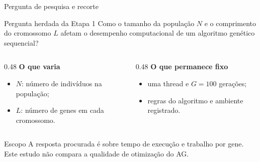 \documentclass[aspectratio=169,11pt]{beamer}
\begin{document}
\begin{frame}{Pergunta de pesquisa e recorte}
    \begin{questionbox}{Pergunta herdada da Etapa 1}
        Como o tamanho da população $N$ e o comprimento do cromossomo $L$
        afetam o desempenho computacional de um algoritmo genético sequencial?
    \end{questionbox}
    \vspace{0.28cm}
    \begin{columns}[T,onlytextwidth]
        \begin{column}{0.48\textwidth}
            \textbf{O que varia}
            \begin{itemize}
                \item $N$: número de indivíduos na população;
                \item $L$: número de genes em cada cromossomo.
            \end{itemize}
        \end{column}
        \begin{column}{0.48\textwidth}
            \textbf{O que permanece fixo}
            \begin{itemize}
                \item uma thread e $G=100$ gerações;
                \item regras do algoritmo e ambiente registrado.
            \end{itemize}
        \end{column}
    \end{columns}
    \vspace{0.25cm}
    \begin{impactbox}{Escopo}
        A resposta procurada é sobre tempo de execução e trabalho por gene.
        Este estudo não compara a qualidade de otimização do AG.
    \end{impactbox}
\end{frame}
\end{document}
